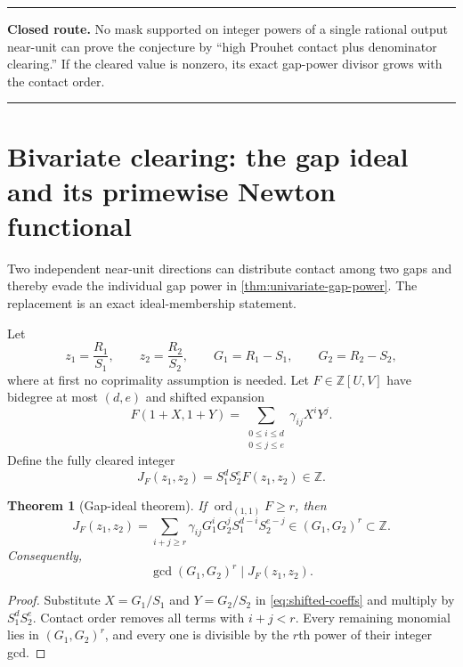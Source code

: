 \documentclass[11pt,oneside]{article}
\newtheorem{theorem}{Theorem}[section]
\theoremstyle{definition}
\theoremstyle{remark}
\newcommand{\Z}{\mathbb Z}
\newcommand{\ord}{\operatorname{ord}}
\newenvironment{resultbox}
{\begin{center}\begin{minipage}{0.94\textwidth}\hrule\vspace{0.45em}}
{\vspace{0.35em}\hrule\end{minipage}\end{center}}
\begin{document}
\begin{resultbox}
\textbf{Closed route.}  No mask supported on integer powers of a single rational output
near-unit can prove the conjecture by ``high Prouhet contact plus denominator clearing.''  If
the cleared value is nonzero, its exact gap-power divisor grows with the contact order.
\end{resultbox}

\section{Bivariate clearing: the gap ideal and its primewise Newton functional}
\label{sec:gap-ideal}

Two independent near-unit directions can distribute contact among two gaps and thereby evade
the individual gap power in \cref{thm:univariate-gap-power}.  The replacement is an exact
ideal-membership statement.

Let
\[
 z_1=\frac{R_1}{S_1},\qquad
 z_2=\frac{R_2}{S_2},
 \qquad
 G_1=R_1-S_1,\qquad G_2=R_2-S_2,
\]
where at first no coprimality assumption is needed.  Let $F\in\Z[U,V]$ have bidegree at most
$(d,e)$ and shifted expansion
\begin{equation}
 F(1+X,1+Y)=\sum_{\substack{0\le i\le d\\0\le j\le e}}\gamma_{ij}X^iY^j.
 \label{eq:shifted-coeffs}
\end{equation}
Define the fully cleared integer
\begin{equation}
 J_F(z_1,z_2)=S_1^dS_2^eF(z_1,z_2)\in\Z.
 \label{eq:cleared-bivariate}
\end{equation}

\begin{theorem}[Gap-ideal theorem]
\label{thm:gap-ideal}
If $\ord_{(1,1)}F\ge r$, then
\begin{equation}
 J_F(z_1,z_2)
 =\sum_{i+j\ge r}\gamma_{ij}
   G_1^iG_2^jS_1^{d-i}S_2^{e-j}
 \in (G_1,G_2)^r\subset\Z.
 \label{eq:gap-ideal-expansion}
\end{equation}
Consequently,
\begin{equation}
 \gcd(G_1,G_2)^r\mid J_F(z_1,z_2).
 \label{eq:gcd-gap-floor}
\end{equation}
\end{theorem}

\begin{proof}
Substitute $X=G_1/S_1$ and $Y=G_2/S_2$ in \eqref{eq:shifted-coeffs} and multiply by
$S_1^dS_2^e$.  Contact order removes all terms with $i+j<r$.  Every remaining monomial lies
in $(G_1,G_2)^r$, and every one is divisible by the $r$th power of their integer gcd.
\end{proof}
\end{document}
